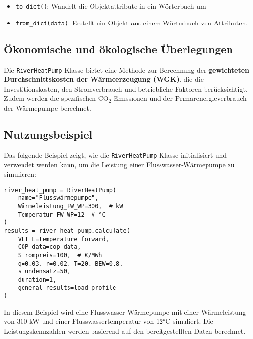 \begin{itemize}
    \item \texttt{to\_dict()}: Wandelt die Objektattribute in ein Wörterbuch um.

    \item \texttt{from\_dict(data)}: Erstellt ein Objekt aus einem Wörterbuch von Attributen.
\end{itemize}

\subsection{Ökonomische und ökologische Überlegungen}
Die \texttt{RiverHeatPump}-Klasse bietet eine Methode zur Berechnung der \textbf{gewichteten Durchschnittskosten der Wärmeerzeugung (WGK)}, die die Investitionskosten, den Stromverbrauch und betriebliche Faktoren berücksichtigt. Zudem werden die spezifischen CO$_2$-Emissionen und der Primärenergieverbrauch der Wärmepumpe berechnet.

\subsection{Nutzungsbeispiel}
Das folgende Beispiel zeigt, wie die \texttt{RiverHeatPump}-Klasse initialisiert und verwendet werden kann, um die Leistung einer Flusswasser-Wärmepumpe zu simulieren:

\begin{verbatim}
river_heat_pump = RiverHeatPump(
    name="Flusswärmepumpe", 
    Wärmeleistung_FW_WP=300,  # kW
    Temperatur_FW_WP=12  # °C
)
results = river_heat_pump.calculate(
    VLT_L=temperature_forward, 
    COP_data=cop_data, 
    Strompreis=100,  # €/MWh
    q=0.03, r=0.02, T=20, BEW=0.8, 
    stundensatz=50, 
    duration=1, 
    general_results=load_profile
)
\end{verbatim}
In diesem Beispiel wird eine Flusswasser-Wärmepumpe mit einer Wärmeleistung von 300 kW und einer Flusswassertemperatur von 12°C simuliert. Die Leistungskennzahlen werden basierend auf den bereitgestellten Daten berechnet.
